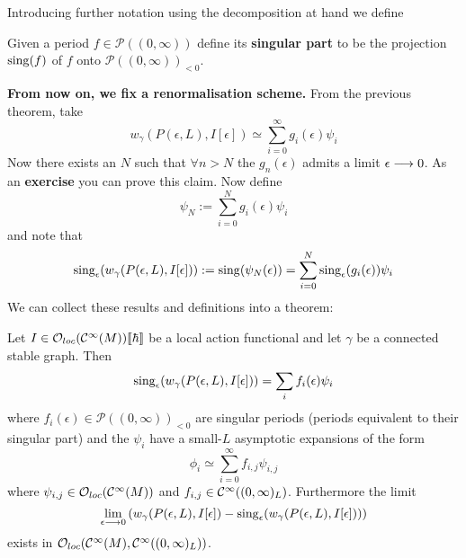 Introducing further notation using the decomposition at hand we define

\begin{definition}
  Given a period $f \in \mathcal{P}((0,\infty))$ define its \textbf{singular part} to be the projection $\operatorname{sing}(f)$ of $f$ onto $\mathcal{P}((0,\infty))_{< 0}$.
\end{definition}

\textbf{From now on, we fix a renormalisation scheme.} From the previous theorem, take
$$ w_\gamma (P(\epsilon,L), I[\epsilon]) \simeq \sum_{i=0}^{\infty} g_i(\epsilon) \psi_i $$
Now there exists an $N$ such that $\forall n > N$ the $g_n(\epsilon)$ admits a limit $\epsilon \lra 0$. As an \textbf{exercise} you can prove this claim. Now define
$$ \psi_N := \sum_{i=0}^N g_i(\epsilon) \psi_i $$
and note that
$$ \sing_\epsilon (w_\gamma(P(\epsilon,L), I[\epsilon])) := \sing( \psi_N(\epsilon)) = \sum_{i=0}^N \sing_\epsilon(g_i(\epsilon)) \psi_i $$
We can collect these results and definitions into a theorem:

\begin{theo}
  Let $I \in \mathcal{O}_{loc}(\mathcal{C}^{\infty}(M)) \llbracket \hbar \rrbracket$ be a local action functional and let $\gamma$ be a connected stable graph. Then
  $$ \sing_\epsilon(w_\gamma(P(\epsilon,L), I[\epsilon])) = \sum_i f_i(\epsilon) \psi_i  $$
  where $f_i(\epsilon) \in \mathcal{P}((0,\infty))_{<0}$ are singular periods (periods equivalent to their singular part) and the $\psi_i$ have a small-$L$ asymptotic expansions of the form
  $$ \phi_i \simeq \sum_{i = 0}^\infty f_{i,j} \psi_{i,j} $$
  where $\psi_{i,j} \in \mathcal{O}_{loc}(\mathcal{C}^{\infty}(M))$ and $f_{i,j} \in \mathcal{C}^{\infty}((0,\infty)_L)$. Furthermore the limit
  $$ \lim_{\epsilon \lra 0} \left( w_\gamma (P(\epsilon,L), I[\epsilon]) - \sing_\epsilon(w_\gamma (P(\epsilon,L), I[\epsilon])) \right) $$
  exists in $\mathcal{O}_{loc}(\mathcal{C}^{\infty}(M), \mathcal{C}^{\infty}((0,\infty)_L))$.
\end{theo}

